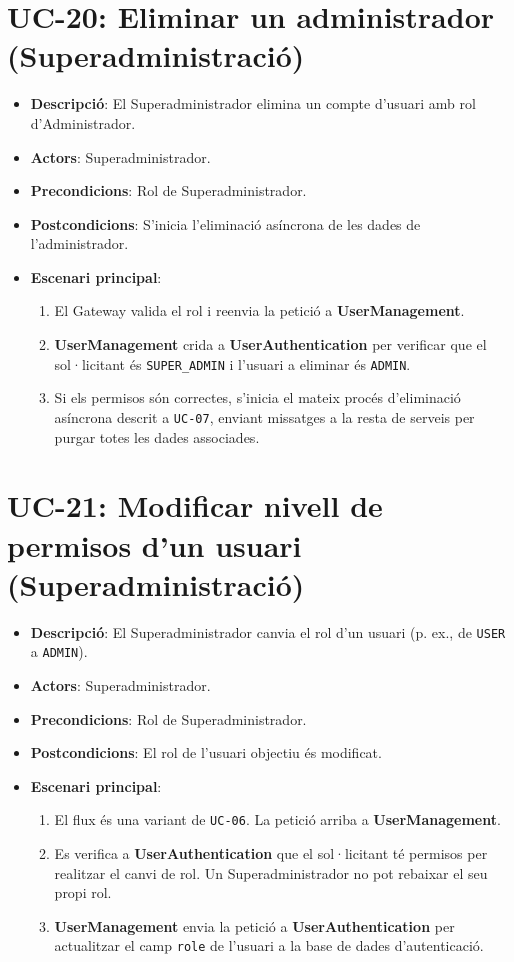 \section{UC-20: Eliminar un administrador (Superadministració)}
\begin{itemize}
    \item \textbf{Descripció}: El Superadministrador elimina un compte d'usuari amb rol d'Administrador.
    \item \textbf{Actors}: Superadministrador.
    \item \textbf{Precondicions}: Rol de Superadministrador.
    \item \textbf{Postcondicions}: S'inicia l'eliminació asíncrona de les dades de l'administrador.
    \item \textbf{Escenari principal}:
    \begin{enumerate}
        \item El Gateway valida el rol i reenvia la petició a \textbf{UserManagement}.
        \item \textbf{UserManagement} crida a \textbf{UserAuthentication} per verificar que el sol·licitant és \texttt{SUPER\_ADMIN} i l'usuari a eliminar és \texttt{ADMIN}.
        \item Si els permisos són correctes, s'inicia el mateix procés d'eliminació asíncrona descrit a \texttt{UC-07}, enviant missatges a la resta de serveis per purgar totes les dades associades.
    \end{enumerate}
\end{itemize}

\section{UC-21: Modificar nivell de permisos d'un usuari (Superadministració)}
\begin{itemize}
    \item \textbf{Descripció}: El Superadministrador canvia el rol d'un usuari (p. ex., de \texttt{USER} a \texttt{ADMIN}).
    \item \textbf{Actors}: Superadministrador.
    \item \textbf{Precondicions}: Rol de Superadministrador.
    \item \textbf{Postcondicions}: El rol de l'usuari objectiu és modificat.
    \item \textbf{Escenari principal}:
    \begin{enumerate}
        \item El flux és una variant de \texttt{UC-06}. La petició arriba a \textbf{UserManagement}.
        \item Es verifica a \textbf{UserAuthentication} que el sol·licitant té permisos per realitzar el canvi de rol. Un Superadministrador no pot rebaixar el seu propi rol.
        \item \textbf{UserManagement} envia la petició a \textbf{UserAuthentication} per actualitzar el camp \texttt{role} de l'usuari a la base de dades d'autenticació.
    \end{enumerate}
\end{itemize}

